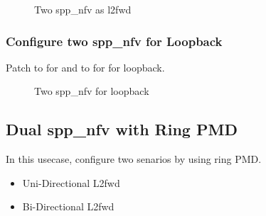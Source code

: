 \documentclass[a4paper,11pt,openany,oneside,english]{sphinxmanual}
\begin{document}
\begin{figure}[htbp]
\centering
\capstart

\noindent{}
\caption{Two spp\_nfv as l2fwd}\label{\detokenize{usecases/spp_nfv:id2}}\label{\detokenize{usecases/spp_nfv:figure-spp-two-nfv-as-l2fwd}}\end{figure}


\subsubsection{Configure two spp\_nfv for Loopback}
\label{\detokenize{usecases/spp_nfv:configure-two-spp-nfv-for-loopback}}
Patch  to  for  and
 to  for  for loopback.

\begin{sphinxVerbatim}[commandchars=\\\{\},formatcom=\footnotesize]
\end{sphinxVerbatim}

\begin{figure}[htbp]
\centering
\capstart

\noindent{}
\caption{Two spp\_nfv for loopback}\label{\detokenize{usecases/spp_nfv:id3}}\label{\detokenize{usecases/spp_nfv:figure-spp-two-nfv-loopback}}\end{figure}


\subsection{Dual spp\_nfv with Ring PMD}
\label{\detokenize{usecases/spp_nfv:dual-spp-nfv-with-ring-pmd}}
In this usecase, configure two senarios by using ring PMD.
\begin{itemize}
\item {} 
Uni-Directional L2fwd

\item {} 
Bi-Directional L2fwd

\end{itemize}
\end{document}
